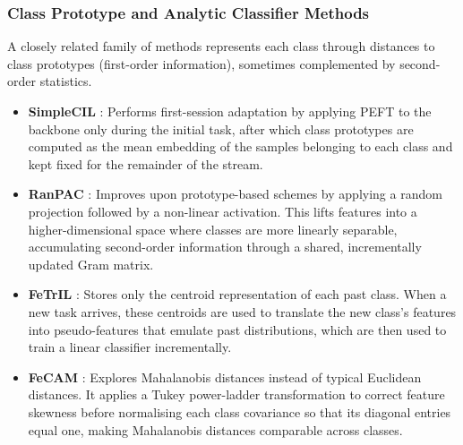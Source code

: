 \subsubsection{Class Prototype and Analytic Classifier Methods}
\label{sec:marco:prototype_methods}
A closely related family of methods represents each class through distances to class prototypes (first-order information), sometimes complemented by second-order statistics.
\begin{itemize}
	\item \textbf{SimpleCIL} \cite{janson2022simple}: Performs first-session adaptation by applying PEFT to the backbone only during the initial task, after which class prototypes are computed as the mean embedding of the samples belonging to each class and kept fixed for the remainder of the stream.
	\item \textbf{RanPAC} \cite{mcdonnell2023ranpac}: Improves upon prototype-based schemes by applying a random projection followed by a non-linear activation. This lifts features into a higher-dimensional space where classes are more linearly separable, accumulating second-order information through a shared, incrementally updated Gram matrix.
	\item \textbf{FeTrIL} \cite{petit2023fetril}: Stores only the centroid representation of each past class. When a new task arrives, these centroids are used to translate the new class's features into pseudo-features that emulate past distributions, which are then used to train a linear classifier incrementally.
	\item \textbf{FeCAM} \cite{goswami2024fecam}: Explores Mahalanobis distances instead of typical Euclidean distances. It applies a Tukey power-ladder transformation to correct feature skewness before normalising each class covariance so that its diagonal entries equal one, making Mahalanobis distances comparable across classes.
\end{itemize}

